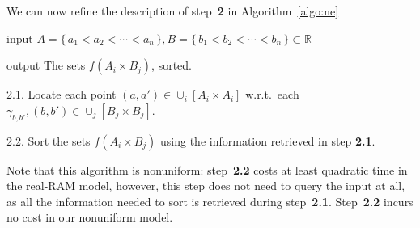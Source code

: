 We can now refine the description of step~\textbf{2} in Algorithm~\ref{algo:ne}
\begin{algorithm}\label{algo:sfaixbj}
\item[input] $A = \{\,a_1<a_2<\cdots<a_n\,\},B = \{\,b_1<b_2<\cdots<b_n\,\}
    \subset \mathbb{R}$
\item[output] The sets $f(A_i \times B_j)$, sorted.
\item[2.1.] Locate each point $(a,a') \in \cup_i [A_i \times A_i]$ w.r.t.\
    each $\gamma_{b,b'}, (b,b') \in \cup_j [B_j \times B_j]$.
\item[2.2.] Sort the sets $f(A_i \times B_j)$ using the
    information retrieved in step \textbf{2.1}.
\end{algorithm}
Note that this algorithm is nonuniform: step~\textbf{2.2} costs at least
quadratic time in the real-RAM model, however, this step does not need to
query the input at all, as all the information needed to sort is retrieved during
step~\textbf{2.1}.
Step~\textbf{2.2} incurs no cost in
our nonuniform model.


